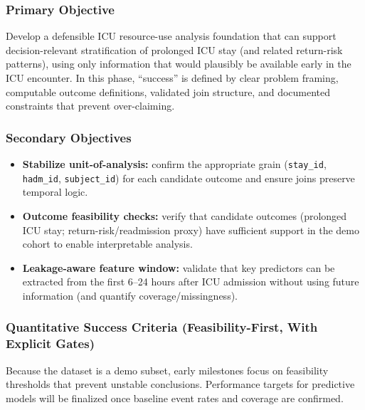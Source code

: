 \documentclass[12pt]{article}
\begin{document}
\subsubsection*{Primary Objective}
Develop a defensible ICU resource-use analysis foundation that can support decision-relevant stratification of prolonged ICU stay (and related return-risk patterns), using only information that would plausibly be available early in the ICU encounter. In this phase, ``success'' is defined by clear problem framing, computable outcome definitions, validated join structure, and documented constraints that prevent over-claiming.

\subsubsection*{Secondary Objectives}
\begin{itemize}[leftmargin=1.5em]
    \item \textbf{Stabilize unit-of-analysis:} confirm the appropriate grain (\texttt{stay\_id}, \texttt{hadm\_id}, \texttt{subject\_id}) for each candidate outcome and ensure joins preserve temporal logic.
    \item \textbf{Outcome feasibility checks:} verify that candidate outcomes (prolonged ICU stay; return-risk/readmission proxy) have sufficient support in the demo cohort to enable interpretable analysis.
    \item \textbf{Leakage-aware feature window:} validate that key predictors can be extracted from the first 6--24 hours after ICU admission without using future information (and quantify coverage/missingness).
\end{itemize}

\subsubsection*{Quantitative Success Criteria (Feasibility-First, With Explicit Gates)}
Because the dataset is a demo subset, early milestones focus on feasibility thresholds that prevent unstable conclusions. Performance targets for predictive models will be finalized once baseline event rates and coverage are confirmed.

\setlength{\tabcolsep}{4pt}
\renewcommand{\arraystretch}{1.1}
\end{document}

